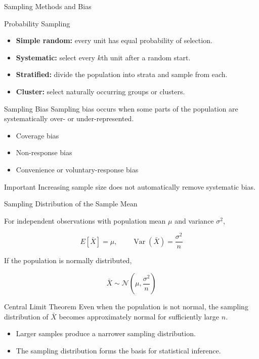 \documentclass{beamer}
\begin{document}
\begin{frame}{Sampling Methods and Bias}

\begin{block}{Probability Sampling}
\begin{itemize}
    \item \textbf{Simple random:} every unit has equal probability of selection.
    \item \textbf{Systematic:} select every $k$th unit after a random start.
    \item \textbf{Stratified:} divide the population into strata and sample from each.
    \item \textbf{Cluster:} select naturally occurring groups or clusters.
\end{itemize}
\end{block}

\begin{block}{Sampling Bias}
Sampling bias occurs when some parts of the population are
systematically over- or under-represented.

\begin{itemize}
    \item Coverage bias
    \item Non-response bias
    \item Convenience or voluntary-response bias
\end{itemize}
\end{block}

\begin{block}{Important}
Increasing sample size does not automatically remove systematic bias.
\end{block}

\end{frame}


\begin{frame}{Sampling Distribution of the Sample Mean}

For independent observations with population mean $\mu$
and variance $\sigma^2$,

\[
\boxed{
E[\bar X]=\mu,
\qquad
\operatorname{Var}(\bar X)=\frac{\sigma^2}{n}
}
\]

If the population is normally distributed,

\[
\boxed{
\bar X\sim
\mathcal{N}\left(\mu,\frac{\sigma^2}{n}\right)
}
\]

\begin{block}{Central Limit Theorem}
Even when the population is not normal, the sampling distribution
of $\bar X$ becomes approximately normal for sufficiently large $n$.
\end{block}

\begin{itemize}
    \item Larger samples produce a narrower sampling distribution.
    \item The sampling distribution forms the basis for statistical inference.
\end{itemize}

\end{frame}
\end{document}
